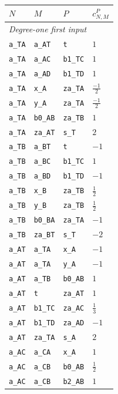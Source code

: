 \begin{longtable}{llll}\hline $N$ & $M$ & $P$ & $c_{N,M}^{P}$\\\hline\endhead
\multicolumn{4}{l}{\textit{Degree-one first input}}\\\hline
\texttt{a\_TA} & \texttt{a\_AT} & \texttt{t} & $1$\\
\texttt{a\_TA} & \texttt{a\_AC} & \texttt{b1\_TC} & $1$\\
\texttt{a\_TA} & \texttt{a\_AD} & \texttt{b1\_TD} & $1$\\
\texttt{a\_TA} & \texttt{x\_A} & \texttt{za\_TA} & $\frac{-1}{2}$\\
\texttt{a\_TA} & \texttt{y\_A} & \texttt{za\_TA} & $\frac{-1}{2}$\\
\texttt{a\_TA} & \texttt{b0\_AB} & \texttt{za\_TB} & $1$\\
\texttt{a\_TA} & \texttt{za\_AT} & \texttt{s\_T} & $2$\\
\texttt{a\_TB} & \texttt{a\_BT} & \texttt{t} & $-1$\\
\texttt{a\_TB} & \texttt{a\_BC} & \texttt{b1\_TC} & $1$\\
\texttt{a\_TB} & \texttt{a\_BD} & \texttt{b1\_TD} & $-1$\\
\texttt{a\_TB} & \texttt{x\_B} & \texttt{za\_TB} & $\frac{1}{2}$\\
\texttt{a\_TB} & \texttt{y\_B} & \texttt{za\_TB} & $\frac{1}{2}$\\
\texttt{a\_TB} & \texttt{b0\_BA} & \texttt{za\_TA} & $-1$\\
\texttt{a\_TB} & \texttt{za\_BT} & \texttt{s\_T} & $-2$\\
\texttt{a\_AT} & \texttt{a\_TA} & \texttt{x\_A} & $-1$\\
\texttt{a\_AT} & \texttt{a\_TA} & \texttt{y\_A} & $-1$\\
\texttt{a\_AT} & \texttt{a\_TB} & \texttt{b0\_AB} & $1$\\
\texttt{a\_AT} & \texttt{t} & \texttt{za\_AT} & $1$\\
\texttt{a\_AT} & \texttt{b1\_TC} & \texttt{za\_AC} & $\frac{1}{3}$\\
\texttt{a\_AT} & \texttt{b1\_TD} & \texttt{za\_AD} & $-1$\\
\texttt{a\_AT} & \texttt{za\_TA} & \texttt{s\_A} & $2$\\
\texttt{a\_AC} & \texttt{a\_CA} & \texttt{x\_A} & $1$\\
\texttt{a\_AC} & \texttt{a\_CB} & \texttt{b0\_AB} & $\frac{1}{2}$\\
\texttt{a\_AC} & \texttt{a\_CB} & \texttt{b2\_AB} & $1$\\

\end{longtable}
